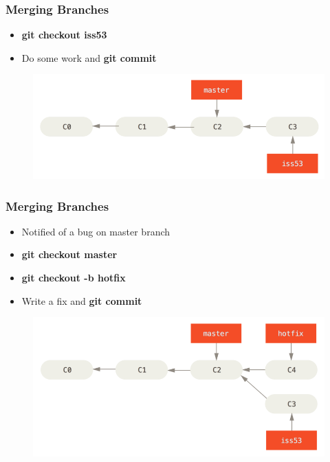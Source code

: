 \documentclass{beamer}
\begin{document}
\begin{frame}
	\frametitle{Merging Branches}
	\begin{itemize}
		\item{\textbf{git checkout iss53}}
		\item{Do some work and \textbf{git commit}}
	\end{itemize}
	\begin{figure}
		\includegraphics[scale=0.4]{Merging_Branches-1.png}
	\end{figure}
\end{frame}

\begin{frame}
	\frametitle{Merging Branches}
	\begin{itemize}
		\item{Notified of a bug on master branch}
		\item{\textbf{git checkout master}}
		\item{\textbf{git checkout -b hotfix}}
		\item{Write a fix and \textbf{git commit}}
	\end{itemize}
	\begin{figure}
		\includegraphics[scale=0.4]{Merging_Branches-2.png}
	\end{figure}
\end{frame}
\end{document}
